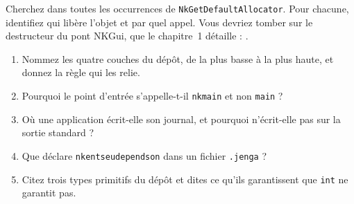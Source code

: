\begin{nkdemo}
Cherchez dans  toutes les occurrences de
\texttt{NkGetDefaultAllocator}. Pour chacune, identifiez qui libère l'objet et
par quel appel. Vous devriez tomber sur le destructeur du pont NKGui, que le
chapitre~1 détaille :
.
\end{nkdemo}

\begin{nkquestions}
\begin{enumerate}
\item Nommez les quatre couches du dépôt, de la plus basse à la plus haute, et
      donnez la règle qui les relie.
\item Pourquoi le point d'entrée s'appelle-t-il \texttt{nkmain} et non
      \texttt{main} ?
\item Où une application écrit-elle son journal, et pourquoi n'écrit-elle pas
      sur la sortie standard ?
\item Que déclare \texttt{nkentseudependson} dans un fichier \texttt{.jenga} ?
\item Citez trois types primitifs du dépôt et dites ce qu'ils garantissent que
      \texttt{int} ne garantit pas.
\end{enumerate}
\end{nkquestions}
